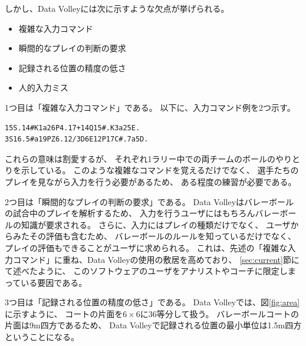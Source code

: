 \documentclass[a4j, fleqn, 12pt]{jsreport}
\begin{document}
        しかし、Data Volleyには次に示すような欠点が挙げられる。

        \begin{itemize}
            \item 複雑な入力コマンド
            \item 瞬間的なプレイの判断の要求
            \item 記録される位置の精度の低さ
            \item 人的入力ミス
        \end{itemize}

        1つ目は「複雑な入力コマンド」である。
        以下に、入力コマンド例を2つ示す。

        \begin{verbatim}
15S.14#K1a26P4.17+14Q15#.K3a25E.
3S16.5#a19PZ6.12/3D6E12P17C#.7a5D.
        \end{verbatim}

        これらの意味は割愛するが、
        それぞれ1ラリー中での両チームのボールのやりとりを示している。
        このような複雑なコマンドを覚えるだけでなく、
        選手たちのプレイを見ながら入力を行う必要があるため、
        ある程度の練習が必要である。

        2つ目は「瞬間的なプレイの判断の要求」である。
        Data Volleyはバレーボールの試合中のプレイを解析するため、
        入力を行うユーザにはもちろんバレーボールの知識が要求される。
        さらに、入力にはプレイの種類だけでなく、
        ユーザからみたその評価も含むため、
        バレーボールのルールを知っているだけでなく、
        プレイの評価もできることがユーザに求められる。
        これは、先述の「複雑な入力コマンド」に重ね、Data Volleyの使用の敷居を高めており、
        \ref{sec:current}節にて述べたように、
        このソフトウェアのユーザをアナリストやコーチに限定しまっている要因である。

        3つ目は「記録される位置の精度の低さ」である。
        Data Volleyでは、図\ref{fig:area}に示すように、
        コートの片面を$6\times 6$に36等分して扱う。
        バレーボールコートの片面は9m四方であるため、
        Data Volleyで記録される位置の最小単位は1.5m四方ということになる。
\end{document}
